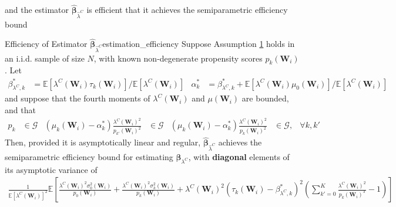 \documentclass[twoside]{article}
\begin{document}
and the estimator $\hat{\boldsymbol{\beta}}_{\hat{\lambda}^C}$ is efficient that it achieves the semiparametric efficiency bound
\begin{proposition}{Efficiency of Estimator $\hat{\boldsymbol{\beta}}_{\hat{\lambda}^C}$}{estimation_efficiency}
    Suppose Assumption \hyperref[assumption1]{1} holds in an i.i.d. sample of size $N$, with known non-degenerate propensity scores $p_k(\mathbf{W}_i)$. Let
    \begin{align*}
        \beta^*_{\lambda^C,k} &= \mathbb{E}\left[\lambda^C(\mathbf{W}_i)\tau_k(\mathbf{W}_i)\right]/\mathbb{E}\left[\lambda^C(\mathbf{W}_i)\right] & \alpha^*_k &= \beta^*_{\lambda^C,k} + \mathbb{E}\left[\lambda^C(\mathbf{W}_i)\mu_0(\mathbf{W}_i)\right]/\mathbb{E}\left[\lambda^C(\mathbf{W}_i)\right]
    \end{align*} 
    and suppose that the fourth moments of $\lambda^C(\mathbf{W}_i)$ and $\mu(\mathbf{W}_i)$ are bounded, and that 
    \begin{align*}
        p_k & \in \mathcal{G} & \left(\mu_k(\mathbf{W}_i)-\alpha^*_k\right)\frac{\lambda^C(\mathbf{W}_i)^2}{p_{k'}(\mathbf{W}_i)^2}&\in \mathcal{G} & \left(\mu_k(\mathbf{W}_i)-\alpha^*_k\right)\frac{\lambda^C(\mathbf{W}_i)^2}{p_{k}(\mathbf{W}_i)^2}&\in \mathcal{G},&\forall k,k'
    \end{align*}
    Then, provided it is asymptotically linear and regular, $\hat{\boldsymbol{\beta}}_{\hat{\lambda}^C}$ achieves the semiparametric efficiency bound for estimating $\boldsymbol{\beta}_{\lambda^C}$, with \textbf{diagonal} elements of its asymptotic variance of 
    \begin{align*}
        \frac{1}{\mathbb{E}\left[\lambda^C(\mathbf{W}_i)\right]^2} \mathbb{E}\left[ \frac{\lambda^C(\mathbf{W}_i)^2\sigma^2_0(\mathbf{W}_i)}{p_0(\mathbf{W}_i)} + \frac{\lambda^C(\mathbf{W}_i)^2\sigma^2_k(\mathbf{W}_i)}{p_k(\mathbf{W}_i)} + \lambda^C(\mathbf{W}_i)^2\left(\tau_k(\mathbf{W}_i)-\beta^*_{\lambda^C,k}\right)^2 \left( \sum^K_{k'=0}\frac{\lambda^C(\mathbf{W}_i)^2}{p_k(\mathbf{W}_i)^3} -1 \right) \right]
    \end{align*}
\end{proposition}
\end{document}
